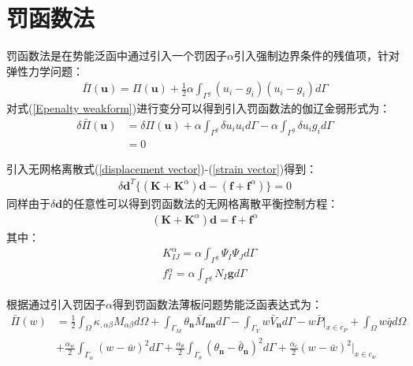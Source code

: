 \section{罚函数法}
罚函数法\cite{}是在势能泛函中通过引入一个罚因子$\alpha$引入强制边界条件的残值项，针对弹性力学问题：
\begin{equation}\label{Epenalty weakform}
\begin{split}
    \bar{\Pi}(\pmb{u})=\Pi(\pmb{u})+\frac{1}{2}\alpha\int_{\Gamma^g}(u_i-g_i)(u_i-g_i)d\Gamma
\end{split}
\end{equation}
对式(\ref{Epenalty weakform})进行变分可以得到引入罚函数法的伽辽金弱形式为：
\begin{equation}
\begin{split}
    \delta\bar{\Pi}(\pmb{u})&=\delta\Pi(\pmb{u})+\alpha\int_{\Gamma^g}\delta u_iu_id\Gamma-\alpha\int_{\Gamma^g}\delta u_ig_id\Gamma\\
    &=0
\end{split}                                                 
\end{equation}\par
引入无网格离散式(\ref{displacement vector})-(\ref{strain vector})得到：
\begin{equation}
\begin{split}
      \delta\pmb{d}^T\{(\pmb{K}+\pmb{K}^{\alpha})\pmb{d}-(\pmb{f}+\pmb{f}^{\alpha})\}=0
\end{split}                                                 
\end{equation}
同样由于$\delta\pmb{d}$的任意性可以得到罚函数法的无网格离散平衡控制方程：
\begin{equation}
\begin{split}
    (\pmb{K}+\pmb{K}^{\alpha})\pmb{d}=\pmb{f}+\pmb{f}^{\alpha}
\end{split}
\end{equation}
其中：
\begin{equation}
\begin{split}
  &K^{\alpha}_{IJ}=\alpha\int_{\Gamma^g}\Psi_I\Psi_Jd\Gamma\\
  &f^{\alpha}_I=\alpha\int_{\Gamma^g}N_I\pmb{g}d\Gamma
\end{split}
\end{equation}\par
根据\cite{}通过引入罚因子$\alpha$得到罚函数法薄板问题势能泛函表达式为：
\begin{equation}\label{Ppenalty}
\begin{split}
        \bar{\Pi}(w)&=\frac{1}{2}\int_{\Omega}\kappa_{,\alpha\beta}M_{\alpha\beta}d\Omega+\int_{\Gamma_M}\theta_{\pmb{n}}\bar{M}_{\pmb{nn}}d\Gamma-\int_{\Gamma_V}w\bar{V}_{\pmb{n}}d\Gamma-w\bar{P}\vert_{x\in c_P}+\int_{\Omega}w\bar{q}d\Omega\\
    &+\frac{\alpha_w}{2}\int_{\Gamma_w}(w-\bar{w})^2d\Gamma+\frac{\alpha_{\theta}}{2}\int_{\Gamma_{\theta}}(\theta_{\pmb{n}}-\bar{\theta}_{\pmb{n}})^2d\Gamma+\frac{\alpha_c}{2}(w-\bar{w})^2\vert_{x\in c_w}
\end{split}
\end{equation}
